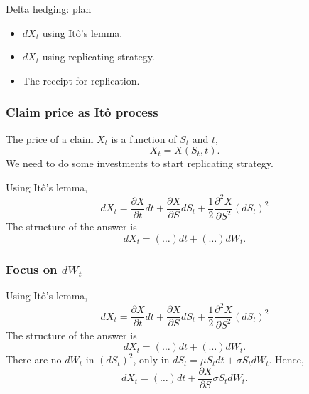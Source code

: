 
\begin{frame} %

    
    \end{frame}
    
    
    \begin{frame}{Delta hedging: plan}
    
      \begin{itemize}[<+->]
        \item $dX_t$ using \alert{Itô's lemma}.
        \item $dX_t$ using \alert{replicating strategy}.
        \item The \alert{receipt} for replication.
      \end{itemize}
    
    \end{frame}
    
    \begin{frame}
        \frametitle{Claim price as Itô process}
        The price of a claim $X_t$ is a function of $S_t$ and $t$,
        \[
            X_t = X(S_t, t).
        \]
        \pause
        We need to do some investments to start \alert{replicating} strategy.
        
        \pause 
        Using Itô's lemma, 
        \[
        dX_t = \frac{\partial X}{\partial t} dt + \frac{\partial X}{\partial S} dS_t + \frac{1}{2}\frac{\partial^2 X}{\partial S^2} (dS_t)^2
        \]
        \pause 
        The structure of the answer is
        \[
        dX_t = (\ldots) dt + (\ldots)dW_t.    
        \]
    \end{frame}
    

    \begin{frame}
        \frametitle{Focus on $dW_t$}
        Using Itô's lemma, 
        \[
        dX_t = \frac{\partial X}{\partial t} dt + \frac{\partial X}{\partial S} dS_t + \frac{1}{2}\frac{\partial^2 X}{\partial S^2} (dS_t)^2
        \]
        The structure of the answer is
        \[
        dX_t = (\ldots) dt + (\ldots)dW_t.    
        \]
        \pause
        There are no $dW_t$ in $(dS_t)^2$, only in $dS_t = \mu S_t dt + \sigma S_t dW_t$.
        \pause 
        Hence,
        \[
        dX_t =   (\ldots) dt +  \frac{\partial X}{\partial S} \sigma S_t dW_t.   
        \]
    
    \end{frame}


